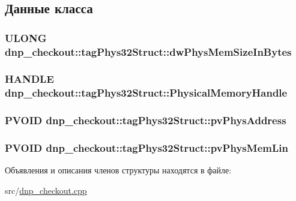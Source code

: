 \subsection{Данные класса}
\hypertarget{structdnp__checkout_1_1tag_phys32_struct_a6e967a76e89b8bccbbfe4408b54914a7}{
\subsubsection[{dw\-Phys\-Mem\-Size\-In\-Bytes}]{\setlength{\rightskip}{0pt plus 5cm}U\-L\-O\-N\-G dnp\-\_\-checkout\-::tag\-Phys32\-Struct\-::dw\-Phys\-Mem\-Size\-In\-Bytes}}\label{structdnp__checkout_1_1tag_phys32_struct_a6e967a76e89b8bccbbfe4408b54914a7}
\hypertarget{structdnp__checkout_1_1tag_phys32_struct_aa241f47b398df59ae03a69e0844578e8}{
\subsubsection[{Physical\-Memory\-Handle}]{\setlength{\rightskip}{0pt plus 5cm}H\-A\-N\-D\-L\-E dnp\-\_\-checkout\-::tag\-Phys32\-Struct\-::\-Physical\-Memory\-Handle}}\label{structdnp__checkout_1_1tag_phys32_struct_aa241f47b398df59ae03a69e0844578e8}
\hypertarget{structdnp__checkout_1_1tag_phys32_struct_a2ee2af7f035bdc45e270643c0acc3f87}{
\subsubsection[{pv\-Phys\-Address}]{\setlength{\rightskip}{0pt plus 5cm}P\-V\-O\-I\-D dnp\-\_\-checkout\-::tag\-Phys32\-Struct\-::pv\-Phys\-Address}}\label{structdnp__checkout_1_1tag_phys32_struct_a2ee2af7f035bdc45e270643c0acc3f87}
\hypertarget{structdnp__checkout_1_1tag_phys32_struct_ab3b4cb40c802f0d4b107a64ff0f875af}{
\subsubsection[{pv\-Phys\-Mem\-Lin}]{\setlength{\rightskip}{0pt plus 5cm}P\-V\-O\-I\-D dnp\-\_\-checkout\-::tag\-Phys32\-Struct\-::pv\-Phys\-Mem\-Lin}}\label{structdnp__checkout_1_1tag_phys32_struct_ab3b4cb40c802f0d4b107a64ff0f875af}


Объявления и описания членов структуры находятся в файле\-:\begin{DoxyCompactItemize}
\item 
src/\hyperlink{dnp__checkout_8cpp}{dnp\-\_\-checkout.\-cpp}\end{DoxyCompactItemize}
